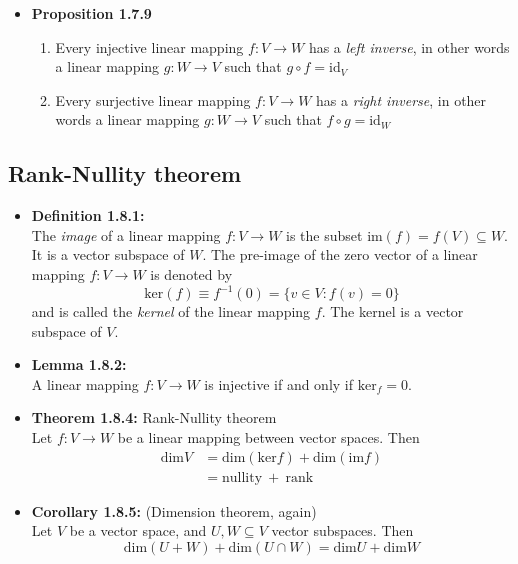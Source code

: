 \documentclass[11pt,a4paper]{article}
\begin{document}
\begin{itemize}
    \item \textbf{Proposition 1.7.9}
        \begin{enumerate}
            \item Every injective linear mapping $f : V \to W$ has a \emph{left inverse},
                in other words a linear mapping $g : W \to V$ such that $g \circ f = \text{id}_V$
            \item Every surjective linear mapping $f: V \to W$ has a \emph{right inverse},
                in other words a linear mapping $g : W \to V$ such that $f \circ g = \text{id}_W$
        \end{enumerate}
\end{itemize}

\subsection{Rank-Nullity theorem}

\begin{itemize}

    \item \textbf{Definition 1.8.1:} \\
        The \emph{image} of a linear mapping $f : V \to W$ is the subset
        $\text{im}(f) = f(V) \subseteq W$.
        It is a vector subspace of $W$.
        The pre-image of the zero vector of a linear mapping $f : V \to W$ is denoted by
        \[
            \text{ker}(f) \equiv f^{-1}(0) = \{v \in V : f(v) = 0 \}
        \]
        and is called the \emph{kernel} of the linear mapping $f$.
        The kernel is a vector subspace of $V$.

    \item \textbf{Lemma 1.8.2:} \\
        A linear mapping $f : V \to W$ is injective if and only if $\text{ker}_f = 0$.

    \item \textbf{Theorem 1.8.4:} Rank-Nullity theorem \\
        Let $f : V \to W$ be a linear mapping between vector spaces. Then
        \begin{align*}{}
            \text{dim}V &= \text{dim}(\text{ker}f) + \text{dim}(\text{im}f) \\
                        &= \text{nullity} \ + \ \text{rank}
        \end{align*}

    \item \textbf{Corollary 1.8.5:} (Dimension theorem, again) \\
        Let $V$ be a vector space, and $U,W \subseteq V$ vector subspaces. Then
        \[
            \text{dim}(U + W) + \text{dim}(U \cap W) = \text{dim}U + \text{dim}W
        \]
\end{itemize}
\end{document}
